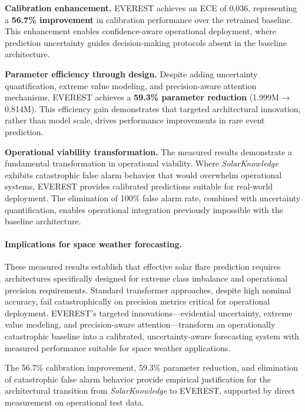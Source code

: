 \textbf{Calibration enhancement.}
\textsc{EVEREST} achieves an ECE of 0.036, representing a \textbf{56.7\% improvement} in calibration performance over the retrained baseline. This enhancement enables confidence-aware operational deployment, where prediction uncertainty guides decision-making protocols absent in the baseline architecture.

\textbf{Parameter efficiency through design.}
Despite adding uncertainty quantification, extreme value modeling, and precision-aware attention mechanisms, \textsc{EVEREST} achieves a \textbf{59.3\% parameter reduction} (1.999M → 0.814M). This efficiency gain demonstrates that targeted architectural innovation, rather than model scale, drives performance improvements in rare event prediction.

\textbf{Operational viability transformation.}
The measured results demonstrate a fundamental transformation in operational viability. Where \textit{SolarKnowledge} exhibits catastrophic false alarm behavior that would overwhelm operational systems, \textsc{EVEREST} provides calibrated predictions suitable for real-world deployment. The elimination of 100\% false alarm rate, combined with uncertainty quantification, enables operational integration previously impossible with the baseline architecture.

\paragraph{Implications for space weather forecasting.}
These measured results establish that effective solar flare prediction requires architectures specifically designed for extreme class imbalance and operational precision requirements. Standard transformer approaches, despite high nominal accuracy, fail catastrophically on precision metrics critical for operational deployment. \textsc{EVEREST}'s targeted innovations---evidential uncertainty, extreme value modeling, and precision-aware attention---transform an operationally catastrophic baseline into a calibrated, uncertainty-aware forecasting system with measured performance suitable for space weather applications.

The 56.7\% calibration improvement, 59.3\% parameter reduction, and elimination of catastrophic false alarm behavior provide empirical justification for the architectural transition from \textit{SolarKnowledge} to \textsc{EVEREST}, supported by direct measurement on operational test data. 
